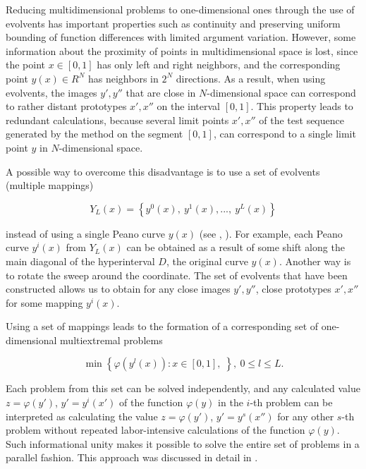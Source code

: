 \documentclass{svproc}
\begin{document}
Reducing multidimensional problems to one-dimensional ones through the use of evolvents has important properties such as continuity and preserving uniform bounding of function differences with limited argument variation. However, some information about the proximity of points in multidimensional space is lost, since the point \(x\in [0,1]\) has only left and right neighbors, and the corresponding point \(y(x) \in R^N\) has neighbors in \(2^N\) directions. As a result, when using evolvents, the images \(y' , y''\) that are close in \(N\)-dimensional space can correspond to rather distant prototypes \(x' , x''\) on the interval \([0,1]\). This property leads to redundant calculations, because several limit points \(x' , x''\) of the test sequence generated by the method on the segment \([0,1]\), can correspond to a single limit point \(y\) in \(N\)-dimensional space.

A possible way to overcome this disadvantage is to use a set of evolvents (multiple mappings)

\begin{displaymath}
\label{eq:142}
Y_L(x)=\left\{y^0(x),\ y^1(x),...,\ y^L(x)\right\}
\end{displaymath}

instead of using a single Peano curve \(y(x)\) (see \cite{Ref19}, \cite{Ref20}). For example, each Peano curve \(y^i(x)\) from \(Y_L(x)\) can be obtained as a result of some shift along the main diagonal of the hyperinterval \(D\), the original curve \(y(x)\). Another way is to rotate the sweep around the coordinate. The set of evolvents that have been constructed allows us to obtain for any close images \(y', y''\), close prototypes \(x', x''\) for some mapping \(y^i(x)\).

   Using a set of mappings leads to the formation of a corresponding set of one-dimensional multiextremal problems

\begin{displaymath}
\label{6_problem_l}
\min{\left\{\varphi(y^l(x)):x\in [0,1], \;  \right\}}, \ 0 \leq l \leq L.
\end{displaymath}

Each problem from this set can be solved independently, and any calculated value \(z= \varphi(y')\), \(y'=y^i(x')\) of the function \(\varphi(y)\) in the \(i\)-th problem can be interpreted as calculating the value \(z= \varphi(y')\), \(y'=y^s(x'')\) for any other \(s\)-th problem without repeated labor-intensive calculations of the function \(\varphi(y)\). Such informational unity makes it possible to solve the entire set of problems in a parallel fashion. This approach was discussed in detail in \cite{Ref21}.
\end{document}
